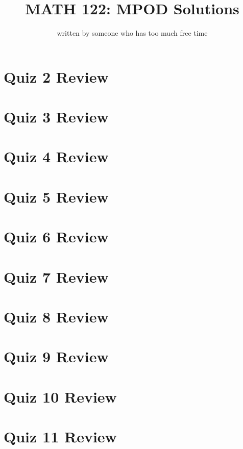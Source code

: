 \documentclass{article}
\title{MATH 122: MPOD Solutions}
\author{written by someone who has too much free time}
\begin{document}
\maketitle
\tableofcontents
\newpage

\section{Quiz 2 Review}


\newpage
\section{Quiz 3 Review}

\newpage
\section{Quiz 4 Review}

\newpage
\section{Quiz 5 Review}

\newpage
\section{Quiz 6 Review}

\newpage
\section{Quiz 7 Review}

\newpage
\section{Quiz 8 Review}

\newpage
\section{Quiz 9 Review}

\newpage
\section{Quiz 10 Review}

\newpage
\section{Quiz 11 Review}
\end{document}
